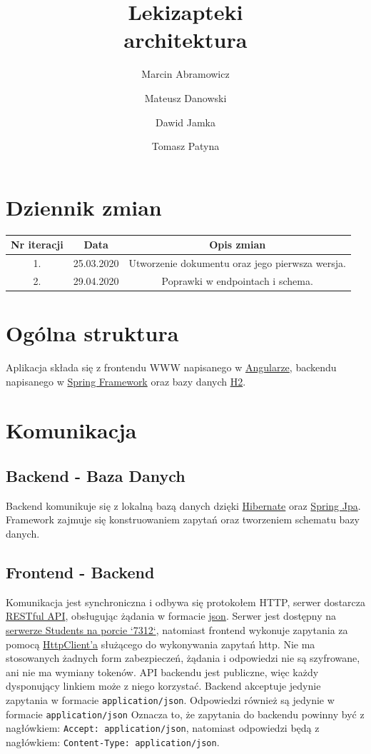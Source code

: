 \documentclass{article}
\title{
Lekizapteki\\
\large architektura}
\author{Marcin Abramowicz \and Mateusz Danowski \and Dawid Jamka \and Tomasz Patyna}
\begin{document}
  \maketitle

  \section{Dziennik zmian}
    \begin{tabular}{|c|c|c|}
      Nr iteracji & Data & Opis zmian \\
      \hline
      1. & 25.03.2020 & Utworzenie dokumentu oraz jego pierwsza wersja. \\
      \hline
      2. & 29.04.2020 & Poprawki w endpointach i schema. \\
    \end{tabular}

  \section{Ogólna struktura}
    Aplikacja składa się z frontendu WWW napisanego w
    \href{https://angular.io}{Angularze}, backendu napisanego w
    \href{https://spring.io}{Spring Framework} oraz bazy danych
    \href {https://www.h2database.com/html/main.html}{H2}.

  \section{Komunikacja}
    \subsection{Backend - Baza Danych}
    Backend komunikuje się z lokalną bazą danych dzięki
    \href{https://hibernate.org}{Hibernate} oraz
    \href{https://spring.io/projects/spring-data-jpa} {Spring Jpa}.
    Framework zajmuje się konstruowaniem zapytań oraz tworzeniem schematu bazy danych.

    \subsection{Frontend - Backend}
    Komunikacja jest synchroniczna i odbywa się protokołem HTTP, serwer dostarcza
    \href{https://en.wikipedia.org/wiki/Representational_state_transfer}{RESTful API},
    obsługując żądania w formacie
    \href{https://en.wikipedia.org/wiki/JSON}{json}.
    Serwer jest dostępny na
    \href{http://students.mimuw.edu.pl:7312}{serwerze Students na porcie `7312`},
    natomiast frontend wykonuje zapytania za pomocą
    \href{https://angular.io/guide/http}{HttpClient'a} służącego do wykonywania zapytań http.
    Nie ma stosowanych żadnych form zabezpieczeń, żądania i odpowiedzi nie są szyfrowane, ani nie ma wymiany tokenów.
    API backendu jest publiczne, więc każdy dysponujący linkiem może z niego korzystać.
    Backend akceptuje jedynie zapytania w formacie \texttt{application/json}.
    Odpowiedzi również są jedynie w formacie \texttt{application/json}
    Oznacza to, że zapytania do backendu powinny być z nagłówkiem: \texttt{Accept: application/json},
    natomiast odpowiedzi będą z nagłówkiem: \texttt{Content-Type: application/json}.
\end{document}
